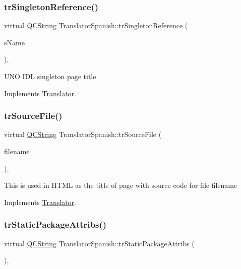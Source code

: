 \subsubsection{\texorpdfstring{trSingletonReference()}{trSingletonReference()}}
{\footnotesize\ttfamily virtual \mbox{\hyperlink{class_q_c_string}{Q\+C\+String}} Translator\+Spanish\+::tr\+Singleton\+Reference (\begin{DoxyParamCaption}\item[{const char $\ast$}]{s\+Name }\end{DoxyParamCaption})\hspace{0.3cm}{\ttfamily [inline]}, {\ttfamily [virtual]}}

U\+NO I\+DL singleton page title 

Implements \mbox{\hyperlink{class_translator}{Translator}}.

\mbox{\label{class_translator_spanish_aed038a2d5e1a8a4d60fd37470cf3fb74}} 
\subsubsection{\texorpdfstring{trSourceFile()}{trSourceFile()}}
{\footnotesize\ttfamily virtual \mbox{\hyperlink{class_q_c_string}{Q\+C\+String}} Translator\+Spanish\+::tr\+Source\+File (\begin{DoxyParamCaption}\item[{\mbox{\hyperlink{class_q_c_string}{Q\+C\+String}} \&}]{filename }\end{DoxyParamCaption})\hspace{0.3cm}{\ttfamily [inline]}, {\ttfamily [virtual]}}

This is used in H\+T\+ML as the title of page with source code for file filename 

Implements \mbox{\hyperlink{class_translator}{Translator}}.

\mbox{\label{class_translator_spanish_aaf51e333d833deb1565e758fc91539e8}} 
\subsubsection{\texorpdfstring{trStaticPackageAttribs()}{trStaticPackageAttribs()}}
{\footnotesize\ttfamily virtual \mbox{\hyperlink{class_q_c_string}{Q\+C\+String}} Translator\+Spanish\+::tr\+Static\+Package\+Attribs (\begin{DoxyParamCaption}{ }\end{DoxyParamCaption})\hspace{0.3cm}{\ttfamily [inline]}, {\ttfamily [virtual]}}

